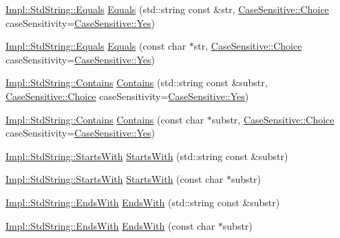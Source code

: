 \begin{DoxyCompactItemize}
\item 
\hyperlink{struct_catch_1_1_matchers_1_1_impl_1_1_std_string_1_1_equals}{Impl\+::\+Std\+String\+::\+Equals} \hyperlink{namespace_catch_1_1_matchers_a840317a3d0f828642c2f55155068bb97}{Equals} (std\+::string const \&str, \hyperlink{struct_catch_1_1_case_sensitive_aad49d3aee2d97066642fffa919685c6a}{Case\+Sensitive\+::\+Choice} case\+Sensitivity=\hyperlink{struct_catch_1_1_case_sensitive_aad49d3aee2d97066642fffa919685c6aa7c5550b69ec3c502e6f609b67f9613c6}{Case\+Sensitive\+::\+Yes})
\item 
\hyperlink{struct_catch_1_1_matchers_1_1_impl_1_1_std_string_1_1_equals}{Impl\+::\+Std\+String\+::\+Equals} \hyperlink{namespace_catch_1_1_matchers_a7454444261cc4af7ee0b0bc82cf74284}{Equals} (const char $\ast$str, \hyperlink{struct_catch_1_1_case_sensitive_aad49d3aee2d97066642fffa919685c6a}{Case\+Sensitive\+::\+Choice} case\+Sensitivity=\hyperlink{struct_catch_1_1_case_sensitive_aad49d3aee2d97066642fffa919685c6aa7c5550b69ec3c502e6f609b67f9613c6}{Case\+Sensitive\+::\+Yes})
\item 
\hyperlink{struct_catch_1_1_matchers_1_1_impl_1_1_std_string_1_1_contains}{Impl\+::\+Std\+String\+::\+Contains} \hyperlink{namespace_catch_1_1_matchers_a07760045eca8bafb7f6618fae10f1b59}{Contains} (std\+::string const \&substr, \hyperlink{struct_catch_1_1_case_sensitive_aad49d3aee2d97066642fffa919685c6a}{Case\+Sensitive\+::\+Choice} case\+Sensitivity=\hyperlink{struct_catch_1_1_case_sensitive_aad49d3aee2d97066642fffa919685c6aa7c5550b69ec3c502e6f609b67f9613c6}{Case\+Sensitive\+::\+Yes})
\item 
\hyperlink{struct_catch_1_1_matchers_1_1_impl_1_1_std_string_1_1_contains}{Impl\+::\+Std\+String\+::\+Contains} \hyperlink{namespace_catch_1_1_matchers_a7bc27b5c696118cbe54690d6c524b3d9}{Contains} (const char $\ast$substr, \hyperlink{struct_catch_1_1_case_sensitive_aad49d3aee2d97066642fffa919685c6a}{Case\+Sensitive\+::\+Choice} case\+Sensitivity=\hyperlink{struct_catch_1_1_case_sensitive_aad49d3aee2d97066642fffa919685c6aa7c5550b69ec3c502e6f609b67f9613c6}{Case\+Sensitive\+::\+Yes})
\item 
\hyperlink{struct_catch_1_1_matchers_1_1_impl_1_1_std_string_1_1_starts_with}{Impl\+::\+Std\+String\+::\+Starts\+With} \hyperlink{namespace_catch_1_1_matchers_a9b6a7704df7d0717dc6686fd2055ffea}{Starts\+With} (std\+::string const \&substr)
\item 
\hyperlink{struct_catch_1_1_matchers_1_1_impl_1_1_std_string_1_1_starts_with}{Impl\+::\+Std\+String\+::\+Starts\+With} \hyperlink{namespace_catch_1_1_matchers_a031985c11b8c8bb62585b3904f9fd2b0}{Starts\+With} (const char $\ast$substr)
\item 
\hyperlink{struct_catch_1_1_matchers_1_1_impl_1_1_std_string_1_1_ends_with}{Impl\+::\+Std\+String\+::\+Ends\+With} \hyperlink{namespace_catch_1_1_matchers_a1e32a2d23a1eb9eda9840c712c7b00c1}{Ends\+With} (std\+::string const \&substr)
\item 
\hyperlink{struct_catch_1_1_matchers_1_1_impl_1_1_std_string_1_1_ends_with}{Impl\+::\+Std\+String\+::\+Ends\+With} \hyperlink{namespace_catch_1_1_matchers_ae3e6d8f7fea6fac6513596b23e5d5153}{Ends\+With} (const char $\ast$substr)
\end{DoxyCompactItemize}


